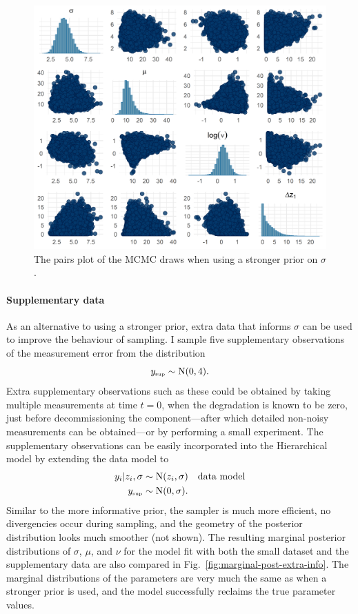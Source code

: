 \begin{figure}
  \centering
  \includegraphics[width=0.8\columnwidth]{./figures/ch-4/strong-prior-pairs.png}
  \caption{The pairs plot of the MCMC draws when using a stronger prior on $\sigma$.}
  \label{fig:pairs-strong-prior}
\end{figure}

\paragraph*{Supplementary data}

As an alternative to using a stronger prior, extra data that informs $\sigma$ can be used to improve the behaviour of sampling. I sample five supplementary observations of the measurement error from the distribution
\begin{equation*}
 y_{\text{\tiny{sup}}} \sim \mbox{N}(0, 4).
\end{equation*}
Extra supplementary observations such as these could be obtained by taking multiple measurements at time $t = 0$, when the degradation is known to be zero, just before decommissioning the component---after which detailed non-noisy measurements can be obtained---or by performing a small experiment. The supplementary observations can be easily incorporated into the Hierarchical model by extending the data model to
\begin{align*}
 y_i|z_i, \sigma & \sim \mbox{N}(z_i, \sigma) && \mbox{data model} \\
 y_{\text{\tiny{sup}}} & \sim \mbox{N}(0, \sigma).
\end{align*}
Similar to the more informative prior, the sampler is much more efficient, no divergencies occur during sampling, and the geometry of the posterior distribution looks much smoother (not shown). The resulting marginal posterior distributions of $\sigma$, $\mu$, and $\nu$ for the model fit with both the small dataset and the supplementary data are also compared in Fig.~\ref{fig:marginal-post-extra-info}. The marginal distributions of the parameters are very much the same as when a stronger prior is used, and the model successfully reclaims the true parameter values.

